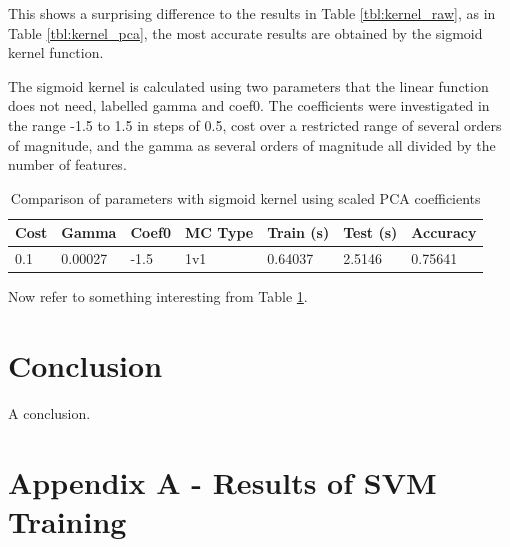 \documentclass[a4paper, 10pt, conference]{ieeeconf}
\begin{document}
This shows a surprising difference to the results in Table \ref{tbl:kernel_raw}, as in Table \ref{tbl:kernel_pca}, the most accurate results are obtained by the sigmoid kernel function.

The sigmoid kernel is calculated using two parameters that the linear function does not need, labelled gamma and coef0. The coefficients were investigated in the range -1.5 to 1.5 in steps of 0.5, cost over a restricted range of several orders of magnitude, and the gamma as several orders of magnitude all divided by the number of features.


\begin{table}
\centering
\label{tbl:sigmoid_params}
\caption{Comparison of parameters with sigmoid kernel using scaled PCA coefficients}
\begin{tabular}{lllllll}
Cost & Gamma & Coef0 & MC Type & Train (s) & Test (s) & Accuracy\\ \hline
0.1 & 0.00027 & -1.5 & 1v1 & 0.64037 & 2.5146 & 0.75641\\ \hline
\end{tabular}
\end{table}

Now refer to something interesting from Table \ref{tbl:sigmoid_params}.

\section{Conclusion}
A conclusion.







\clearpage
\onecolumn
\section{Appendix A - Results of SVM Training}
\end{document}
